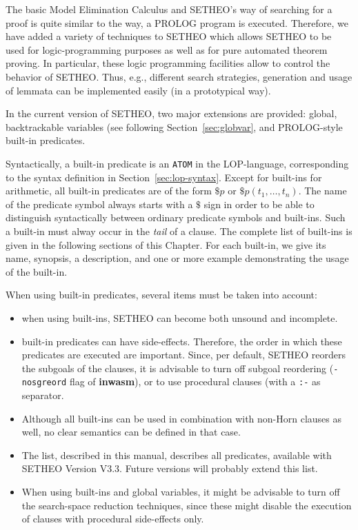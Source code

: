 %

The basic Model Elimination Calculus and SETHEO's way of
searching for a proof is quite similar to the way, a PROLOG program
is executed. 
Therefore, we have added a variety of techniques to SETHEO which allows
SETHEO to be used for logic-programming purposes as well as for
pure automated theorem proving. In particular, these logic programming
facilities allow to control the behavior of SETHEO.
Thus, e.g., different search strategies, generation and usage of
lemmata can be implemented easily (in a prototypical way). 

In the current version of SETHEO, two major extensions are provided:
global, backtrackable variables (see following Section~\ref{sec:globvar}, 
and PROLOG-style built-in predicates.

Syntactically, a built-in predicate is an {\tt ATOM} in the LOP-language,
corresponding to the syntax definition in Section~\ref{sec:lop-syntax}.
Except for built-ins for arithmetic, all built-in predicates
are of the form $\$p$ or $\$p(t_1,\ldots,t_n)$.
The name of the predicate symbol always starts with a $\$ $ sign in order
to be able to distinguish syntactically between ordinary predicate symbols
and built-ins. Such a built-in must alway occur in the {\em tail\/}
of a clause.
The complete list of built-ins is given in the following sections of
this Chapter. For each built-in, we give its name, synopsis, a description,
and one or more example demonstrating the usage of the built-in.

When using built-in predicates, several items must be taken
into account:
\begin{itemize}
\item
when using built-ins, SETHEO can become both unsound and incomplete.
\item
built-in predicates can have side-effects. Therefore, the order in which
these predicates are executed are important. Since, per default,
SETHEO reorders the subgoals of the clauses, it is advisable to turn
off subgoal reordering ({\tt -nosgreord} flag of {\bf inwasm}), or to
use procedural clauses (with a {\tt :-} as separator.

\item
Although all built-ins can be used in combination with non-Horn clauses
as well, no clear semantics can be defined in that case.

\item
The list, described in this manual, describes all predicates, available
with SETHEO Version V3.3. Future versions will probably extend this list.
\item
When using built-ins and global variables, it might be advisable to turn
off the search-space reduction techniques, since these might disable
the execution of clauses with procedural side-effects only.
\end{itemize}


